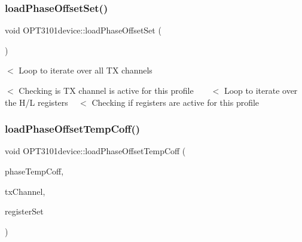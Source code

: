 \mbox{\label{class_o_p_t3101device_accaae5aebd551e2198567c1131887700}} 
\subsubsection{\texorpdfstring{load\+Phase\+Offset\+Set()}{loadPhaseOffsetSet()}}
{\footnotesize\ttfamily void O\+P\+T3101device\+::load\+Phase\+Offset\+Set (\begin{DoxyParamCaption}\item[{void}]{ }\end{DoxyParamCaption})}

$<$ Loop to iterate over all TX channels

$<$ Checking is TX channel is active for this profile ~\newline
~\newline
 $<$ Loop to iterate over the H/L registers ~\newline
 $<$ Checking if registers are active for this profile \mbox{\label{class_o_p_t3101device_a72d8a44690cd8d65852522612478b067}} 
\subsubsection{\texorpdfstring{load\+Phase\+Offset\+Temp\+Coff()}{loadPhaseOffsetTempCoff()}}
{\footnotesize\ttfamily void O\+P\+T3101device\+::load\+Phase\+Offset\+Temp\+Coff (\begin{DoxyParamCaption}\item[{\mbox{\hyperlink{class_o_p_t3101phase_temp_coff}{O\+P\+T3101phase\+Temp\+Coff}} $\ast$}]{phase\+Temp\+Coff,  }\item[{uint8\+\_\+t}]{tx\+Channel,  }\item[{char}]{register\+Set }\end{DoxyParamCaption})}

\mbox{\label{class_o_p_t3101device_a01faedadfb6abb470781ae01fe6b744e}} 
